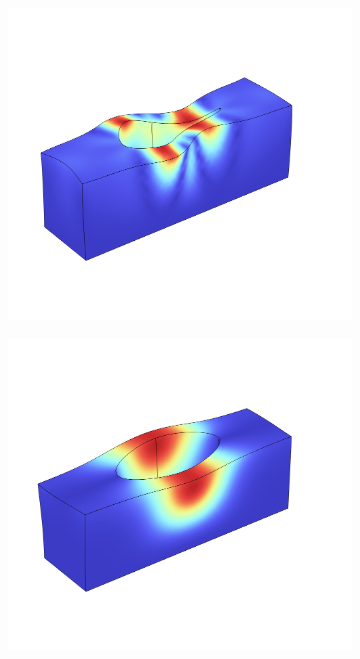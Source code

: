 \begin{figure}[htpb]
\begin{subfigure}[]{0.24\textwidth}
\begin{center}
		\end{center}
		\subcaption{}%
		\label{fig:ms2}
	\end{subfigure}
	\begin{subfigure}[]{0.24\textwidth}
		\begin{center}
			\includegraphics[width=\textwidth]{chapters/theory/modeshape_3.png}
		\end{center}
		\subcaption{}%
		\label{fig:ms3}
	\end{subfigure}
	\begin{subfigure}[]{0.24\textwidth}
		\begin{center}
			\includegraphics[width=\textwidth]{chapters/theory/modeshape_4.png}
		\end{center}
		\subcaption{}%
		\label{fig:ms4}
	\end{subfigure}\\


\end{figure}
